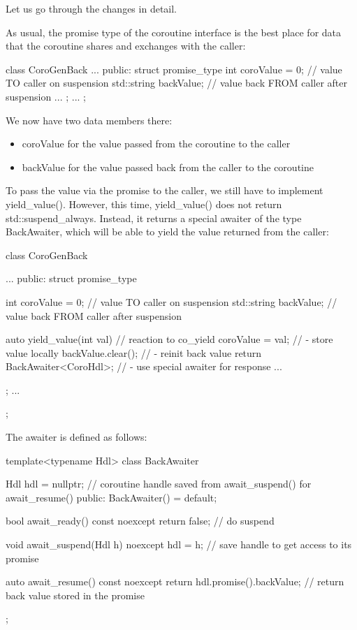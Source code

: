 Let us go through the changes in detail.


As usual, the promise type of the coroutine interface is the best place for data that the coroutine shares and exchanges with the caller:

\begin{cpp}
class CoroGenBack {
	...
	public:
	struct promise_type {
		int coroValue = 0; // value TO caller on suspension
		std::string backValue; // value back FROM caller after suspension
		...
	};
	...
};
\end{cpp}

We now have two data members there:

\begin{itemize}
\item 
coroValue for the value passed from the coroutine to the caller

\item 
backValue for the value passed back from the caller to the coroutine
\end{itemize}


To pass the value via the promise to the caller, we still have to implement yield\_value(). However, this time, yield\_value() does not return std::suspend\_always{}. Instead, it returns a special awaiter of the type BackAwaiter, which will be able to yield the value returned from the caller:

\begin{cpp}
class CoroGenBack {
	...
	public:
	struct promise_type {
		int coroValue = 0; // value TO caller on suspension
		std::string backValue; // value back FROM caller after suspension
		
		auto yield_value(int val) { // reaction to co_yield
			coroValue = val; // - store value locally
			backValue.clear(); // - reinit back value
			return BackAwaiter<CoroHdl>{}; // - use special awaiter for response
		}
		...
	};
	...
};
\end{cpp}

The awaiter is defined as follows:


\begin{cpp}
template<typename Hdl>
class BackAwaiter {
	Hdl hdl = nullptr; // coroutine handle saved from await_suspend() for await_resume()
	public:
	BackAwaiter() = default;
	
	bool await_ready() const noexcept {
		return false; // do suspend
	}
	
	void await_suspend(Hdl h) noexcept {
		hdl = h; // save handle to get access to its promise
	}
	
	auto await_resume() const noexcept {
		return hdl.promise().backValue; // return back value stored in the promise
	}
};
\end{cpp}

